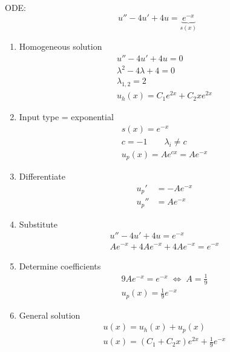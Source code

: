 \begin{examplesection}
    ODE:
    \begin{equation*}
        u'' - 4u' + 4u = \underbrace{e^{-x}}_{s(x)}
    \end{equation*}
    \begin{enumerate}
        \item Homogeneous solution
              \begin{gather*}
                  u'' - 4u' + 4u = 0 \\
                  \lambda^2 -4\lambda+4 = 0\\
                  \lambda_{1,2}=2 \\
                  u_h(x) = C_1e^{2x}+C_2xe^{2x}
              \end{gather*}
        \item Input type = exponential
              \begin{gather*}
                  s(x) = e^{-x} \\
                  c=-1 \qquad \lambda_i \neq c \\
                  u_p(x) = Ae^{cx} = Ae^{-x}
              \end{gather*}
        \item Differentiate
              \begin{align*}
                  u_p'  & = -Ae^{-x} \\
                  u_p'' & = Ae^{-x}
              \end{align*}
        \item Substitute
              \begin{gather*}
                  u'' - 4u' + 4u = e^{-x} \\
                  Ae^{-x} + 4Ae^{-x} + 4Ae^{-x} = e^{-x}
              \end{gather*}
        \item Determine coefficients
              \begin{gather*}
                  9Ae^{-x} = e^{-x} \; \Leftrightarrow \; A =\frac{1}{9} \\
                  u_p(x) = \frac{1}{9}e^{-x}
              \end{gather*}
        \item General solution
              \begin{gather*}
                  u(x) = u_h(x) + u_p(x) \\
                  u(x) = (C_1 + C_2x)e^{2x} + \frac{1}{9}e^{-x}
              \end{gather*}
    \end{enumerate}
\end{examplesection}